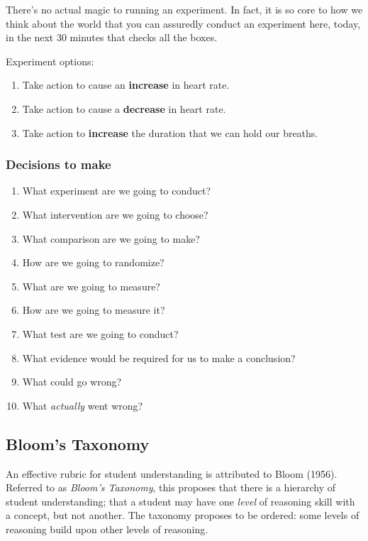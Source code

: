 \documentclass[
]{article}
\providecommand{\tightlist}{%
  \setlength{\itemsep}{0pt}\setlength{\parskip}{0pt}}
\theoremstyle{definition}
\theoremstyle{definition}
\theoremstyle{definition}
\theoremstyle{definition}
\theoremstyle{remark}
\begin{document}
There's no actual magic to running an experiment. In fact, it is so core to how we think about the world that you can assuredly conduct an experiment here, today, in the next 30 minutes that checks all the boxes.

Experiment options:

\begin{enumerate}
\def\labelenumi{\arabic{enumi}.}
\tightlist
\item
  Take action to cause an \textbf{increase} in heart rate.
\item
  Take action to cause a \textbf{decrease} in heart rate.
\item
  Take action to \textbf{increase} the duration that we can hold our breaths.
\end{enumerate}

\subsubsection{Decisions to make}\label{decisions-to-make}

\begin{enumerate}
\def\labelenumi{\arabic{enumi}.}
\tightlist
\item
  What experiment are we going to conduct?
\item
  What intervention are we going to choose?
\item
  What comparison are we going to make?
\item
  How are we going to randomize?
\item
  What are we going to measure?
\item
  How are we going to measure it?
\item
  What test are we going to conduct?
\item
  What evidence would be required for us to make a conclusion?
\item
  What could go wrong?
\item
  What \emph{actually} went wrong?
\end{enumerate}

\subsection*{Bloom's Taxonomy}\label{blooms-taxonomy}

An effective rubric for student understanding is attributed to Bloom (1956). Referred to as \emph{Bloom's Taxonomy}, this proposes that there is a hierarchy of student understanding; that a student may have one \emph{level} of reasoning skill with a concept, but not another. The taxonomy proposes to be ordered: some levels of reasoning build upon other levels of reasoning.
\end{document}
